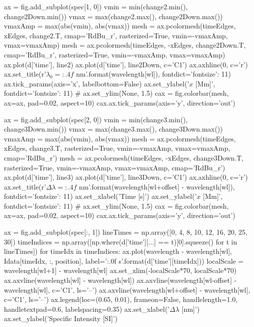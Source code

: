 \begin{pycode}[2DRT]
    ax = fig.add_subplot(spec[1, 0])
    vmin = min(change2.min(), change2Down.min())
    vmax = max(change2.max(), change2Down.max())
    vmaxAmp = max(abs(vmin), abs(vmax))
    mesh = ax.pcolormesh(timeEdges, xEdges, change2.T, cmap='RdBu_r', rasterized=True, vmin=-vmaxAmp, vmax=vmaxAmp)
    mesh = ax.pcolormesh(timeEdges, -xEdges, change2Down.T, cmap='RdBu_r', rasterized=True, vmin=-vmaxAmp, vmax=vmaxAmp)
    ax.plot(d['time'], line2)
    ax.plot(d['time'], line2Down, c='C1')
    ax.axhline(0, c='r')
    ax.set_title(r'$\lambda_0={:.4f}$ nm'.format(wavelength[wl]), fontdict={'fontsize': 11})
    ax.tick_params(axis='x', labelbottom=False)
    ax.set_ylabel('$x$ [Mm]', fontdict={'fontsize': 11})
#     ax.set_ylim(None, 1.5)
    cax = fig.colorbar(mesh, ax=ax, pad=0.02, aspect=10)
    cax.ax.tick_params(axis='y', direction='out')

    ax = fig.add_subplot(spec[2, 0])
    vmin = min(change3.min(), change3Down.min())
    vmax = max(change3.max(), change3Down.max())
    vmaxAmp = max(abs(vmin), abs(vmax))
    mesh = ax.pcolormesh(timeEdges, xEdges, change3.T, rasterized=True, vmin=-vmaxAmp, vmax=vmaxAmp, cmap='RdBu_r')
    mesh = ax.pcolormesh(timeEdges, -xEdges, change3Down.T, rasterized=True, vmin=-vmaxAmp, vmax=vmaxAmp, cmap='RdBu_r')
    ax.plot(d['time'], line3)
    ax.plot(d['time'], line3Down, c='C1')
    ax.axhline(0, c='r')
    ax.set_title(r'$\Delta\lambda={:.4f}$ nm'.format(wavelength[wl+offset] - wavelength[wl]), fontdict={'fontsize': 11})
    ax.set_xlabel('Time [s]')
    ax.set_ylabel('$x$ [Mm]', fontdict={'fontsize': 11})
#     ax.set_ylim(None, 1.5)
    cax = fig.colorbar(mesh, ax=ax, pad=0.02, aspect=10)
    cax.ax.tick_params(axis='y', direction='out')

    ax = fig.add_subplot(spec[:, 1])
    lineTimes = np.array([0, 4, 8, 10, 12, 16, 20, 25, 30])
    timeIndices = np.array([np.where(d['time'][...] == t)[0].squeeze() for t in lineTimes])
    for timeIdx in timeIndices:
        ax.plot(wavelength - wavelength[wl], Idata[timeIdx, :, position], label='{:.0f} s'.format(d['time'][timeIdx]))
    localScale = wavelength[wl+1] - wavelength[wl]
    ax.set_xlim(-localScale*70, localScale*70)
    ax.axvline(wavelength[wl] - wavelength[wl])
    ax.axvline(wavelength[wl-offset] - wavelength[wl], c='C1', ls='--')
    ax.axvline(wavelength[wl+offset] - wavelength[wl], c='C1', ls='--')
    ax.legend(loc=(0.65, 0.01), frameon=False, handlelength=1.0, handletextpad=0.6, labelspacing=0.35)
    ax.set_xlabel('$\Delta\lambda$ [nm]')
    ax.set_ylabel('Specific Intensity [SI]')


\end{pycode}
